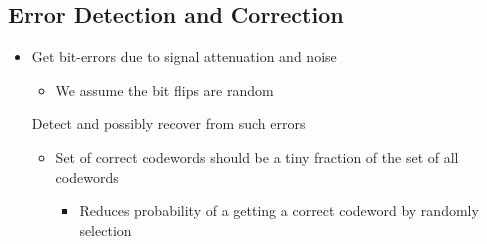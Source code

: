 \subsection{Error Detection and Correction}
\begin{itemize}
    \item Get bit-errors due to signal attenuation and noise
        \begin{itemize}
            \item We assume the bit flips are random
        \end{itemize}
     Detect and possibly recover from such errors
        \begin{itemize}
             Original data concatenated (`+`) with correction bits
                \begin{itemize}
                    \item Consists of \verb|len(D) + len(R)| bits
                     Data bits which if our message
                     Check bits which are computed as $R = \text{fn}(D)$
                \end{itemize}
                \begin{itemize}
                    \item Computes $R = \text{fn}(D)$
                    \item Sets $R$ and sends frame of
                \end{itemize}
                \begin{itemize}
                    \item Takes $D'$ and computes $R'= \text{fn}(D')$
                        \begin{itemize}
                             is $D$ with possible, unknown errors
                        \end{itemize}
                    \item Compare $R = R'$
                \end{itemize}
            \item Set of correct codewords should be a tiny fraction of the set of all codewords
                \begin{itemize}
                    \item Reduces probability of a getting a correct codeword by randomly selection
                \end{itemize}

\end{itemize}
\end{itemize}
